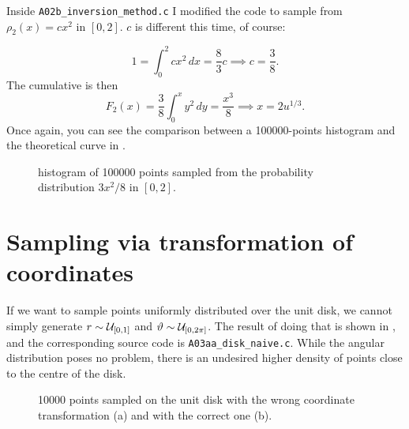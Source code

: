 Inside \texttt{A02b\_inversion\_method.c} I modified the code to sample from
$\rho_2(x) = cx^2$ in $[0, 2]$. $c$ is different this time, of course:

\begin{equation}
    1 = \int_{0}^{2} cx^2 \, dx = \frac{8}{3}c \implies c = \frac{3}{8}.
\end{equation}
The cumulative is then
\begin{equation}
    F_2(x) = \frac{3}{8} \int_{0}^{x} y^2 \, dy = \frac{x^3}{8} \implies x = 2
    u^{1/3}.
\end{equation}
Once again, you can see the comparison between a \num{100000}-points histogram
and the theoretical curve in .

\begin{figure}
    \centering
    
    \caption{histogram of \num{100000} points sampled from the probability
        distribution $3x^2/8$ in $[0, 2]$.}
    \label{fig:A02b}
\end{figure}

\section{Sampling via transformation of coordinates}
If we want to sample points uniformly distributed over the unit disk, we cannot
simply generate $r \sim \mathcal{U}_{[0, 1]}$ and $\vartheta \sim \mathcal{U}_{[0, 2\pi]}$. The
result of doing that is shown in , and the corresponding
source code is \texttt{A03aa\_disk\_naive.c}. While the angular distribution
poses no problem, there is an undesired higher density of points close to the
centre of the disk.

\begin{figure}
    \centering
    \begin{minipage}[t]{0.5\linewidth}
        \centering
        
        \subcaption{}
        \label{subfig:A03aa}
    \end{minipage}\hfill%
    \begin{minipage}[t]{0.5\linewidth} 
        \centering
            
        \subcaption{}
        \label{subfig:A03ab}
    \end{minipage}
    \caption{\num{10000} points sampled on the unit disk with the wrong
        coordinate transformation (a) and with the correct one (b).}
    \label{fig:A03a}
\end{figure}

